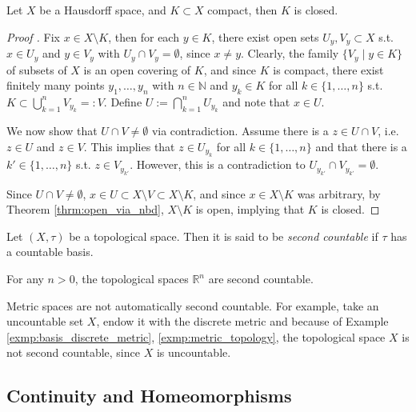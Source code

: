 \begin{theorem}
	Let $X$ be a Hausdorff space, and $K\subset X$ compact, then $K$ is closed.
\end{theorem}

\begin{proof}[Proof \cite{topology-singh, 1329787}]
	Fix $x\in X\setminus K$, then for each $y\in K$, there exist open sets $U_y, V_y\subset X$ s.t. $x\in U_y$ and $y\in V_y$ with $U_y\cap V_y = \emptyset$, since $x\ne y$. Clearly, the family $\{V_{y}\mid y\in K\}$ of subsets of $X$ is an open covering of $K$, and since $K$ is compact, there exist finitely many points $y_1, \dots, y_n$ with $n\in\mathbb N$ and $y_k\in K$ for all $k\in \{1, \dots, n\}$ s.t. $K \subset \bigcup_{k=1}^{n}V_{y_k} =: V$. Define $U := \bigcap_{k=1}^{n}U_{y_k}$ and note that $x\in U$.
	
	We now show that $U \cap V \ne \emptyset$ via contradiction. Assume there is a $z\in U\cap V$, i.e. $z\in U$ and $z\in V$. This implies that $z\in U_{y_k}$ for all $k\in \{1, \dots, n\}$ and that there is a $k'\in\{1, \dots, n\}$ s.t. $z\in V_{y_{k'}}$. However, this is a contradiction to $U_{y_{k'}} \cap V_{y_{k'}} = \emptyset$. 
	
	Since $U\cap V\ne\emptyset$, $x\in U\subset X\setminus V\subset X\setminus K$, and since $x\in X\setminus K$ was arbitrary, by Theorem \ref{thrm:open_via_nbd}, $X\setminus K$ is open, implying that $K$ is closed.
\end{proof}

\begin{defn}
	Let $(X, \tau)$ be a topological space. Then it is said to be \textit{second countable} if $\tau$ has a countable basis. 
\end{defn}

\begin{exmp}
	For any $n > 0$, the topological spaces $\mathbb R^n$ are second countable. 
\end{exmp}

\begin{remark}
	Metric spaces are not automatically second countable. For example, take an uncountable set $X$, endow it with the discrete metric and because of Example \ref{exmp:basis_discrete_metric}, \ref{exmp:metric_topology},  the topological space $X$ is not second countable, since $X$ is uncountable. 
\end{remark}	

\subsection{Continuity and Homeomorphisms}

